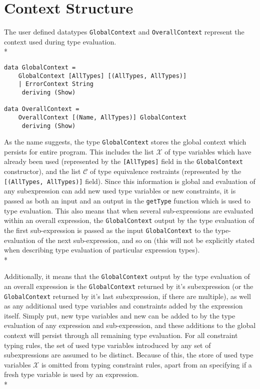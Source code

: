 \documentclass[11pt]{article}
\begin{document}
\section*{Context Structure}

The user defined datatypes \verb|GlobalContext| and \verb|OverallContext| represent the context used during type evaluation.\\*

\begin{verbatim} 
data GlobalContext = 
    GlobalContext [AllTypes] [(AllTypes, AllTypes)]
    | ErrorContext String
     deriving (Show)

data OverallContext = 
    OverallContext [(Name, AllTypes)] GlobalContext
     deriving (Show)
\end{verbatim} 

As the name suggests, the type \verb|GlobalContext| stores the global context which persists for entire program. This includes the list $\mathcal{X}$ of type variables which have already been used (represented by the \verb|[AllTypes]| field in the \verb|GlobalContext| constructor), and the list $\mathcal{C}$ of type equivalence restraints (represented by the \verb|[(AllTypes, AllTypes)]| field). Since this information is global and evaluation of any subexpression can add new used type variables or new constraints, it is passed as both an input and an output in the \verb|getType| function which is used to type evaluation. This also means that when several sub-expressions are evaluated within an overall expression, the \verb|GlobalContext| output by the type evaluation of the first sub-expression is passed as the input \verb|GlobalContext| to the type-evaluation of the next sub-expression, and so on (this will not be explicitly stated when describing type evaluation of particular expression types). \\* 

Additionally, it means that the \verb|GlobalContext| output by the type evaluation of an overall expression is the \verb|GlobalContext| returned by it's subexpression (or the \verb|GlobalContext| returned by it's last subexpression, if there are multiple), as well as any additional used type variables and constraints added by the expression itself. Simply put, new type variables and new can be added to by the type evaluation of any expression and sub-expression, and these additions to the global context will persist through all remaining type evaluation. For all constraint typing rules, the set of used type variables introduced by any set of subexpressions are assumed to be distinct. Because of this, the store of used type variables $\mathcal{X}$ is omitted from typing constraint rules, apart from an specifying if a fresh type variable is used by an expression.\\*
\end{document}
